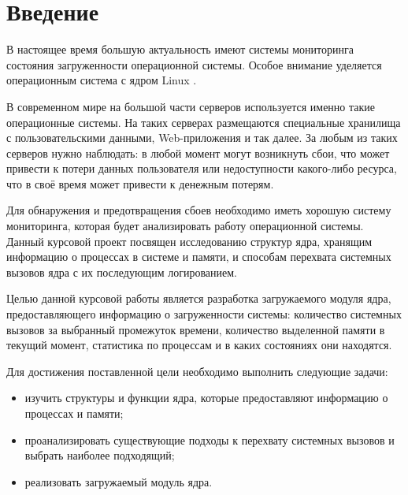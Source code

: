 \chapter*{Введение}

В настоящее время большую актуальность имеют системы мониторинга состояния загруженности операционной системы. Особое внимание уделяется операционным система с ядром Linux \cite{linux}.

В современном мире на большой части серверов используется именно такие операционные системы. На таких серверах размещаются специальные хранилища с пользовательскими данными, Web-приложения и так далее. За любым из таких серверов нужно наблюдать: в любой момент могут возникнуть сбои, что может привести к потери данных пользователя или недоступности какого-либо ресурса, что в своё время может привести к денежным потерям.

Для обнаружения и предотвращения сбоев необходимо иметь хорошую систему мониторинга, которая будет анализировать работу операционной системы. Данный курсовой проект посвящен исследованию структур ядра, хранящим информацию о процессах в системе и памяти, и способам перехвата системных вызовов ядра с их последующим логированием.

Целью данной курсовой работы является разработка загружаемого модуля ядра, предоставляющего информацию о загруженности системы: количество системных вызовов за выбранный промежуток времени, количество выделенной памяти в текущий момент, статистика по процессам и в каких состояниях они находятся.

Для достижения поставленной цели необходимо выполнить следующие задачи:

\begin{itemize}
	\item изучить структуры и функции ядра, которые предоставляют информацию о процессах и памяти;
	\item проанализировать существующие подходы к перехвату системных вызовов и выбрать наиболее подходящий;
	\item реализовать загружаемый модуль ядра.
\end{itemize}